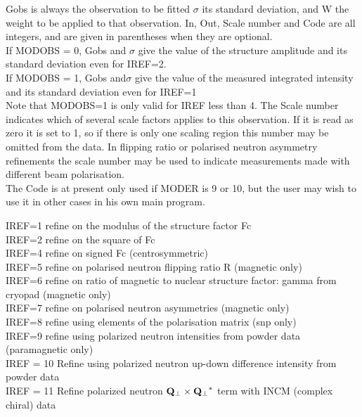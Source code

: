 \begin{varindent}{15mm}Gobs is always the observation to be fitted $\sigma$ its standard deviation,
          and W the weight to be applied to that observation. In, Out,  Scale
          number and Code are all integers, and are given in parentheses when they are optional. \\
If MODOBS = 0, Gobs and $\sigma$  give the value of the structure amplitude and
            its standard deviation even for IREF=2.\\
If MODOBS = 1, Gobs and$\sigma$  give the value of the measured integrated intensity
            and its standard deviation even for IREF=1\\
         Note that MODOBS=1 is only valid for IREF less than 4.
\p 
          The Scale number indicates which of several scale factors applies to
          this observation.  If it is read as zero it is set to 1, so if there
          is only one scaling region this number may be  omitted from the
          data.  In flipping ratio or polarised neutron asymmetry refinements 
          the scale number may be used to indicate measurements made with different 
          beam polarisation.\\
           The Code is at present only used if MODER is 9 or 10, but the user may wish
          to use it in other cases in his own main program.
          \end{varindent}
\p          
{}
\ssk
\begin{varindent}{2 cm}
IREF=1 refine on the modulus of the structure factor Fc\\
IREF=2 refine on the square of Fc\\
IREF=4 refine on signed Fc (centrosymmetric)\\
IREF=5 refine on polarised neutron flipping ratio R (magnetic only)\\
IREF=6 refine on ratio of magnetic to nuclear structure factor: gamma
       from cryopad (magnetic only)\\
IREF=7 refine on polarised neutron asymmetries (magnetic only)\\
IREF=8 refine using elements of the polarisation matrix (snp only)\\
IREF=9 refine using polarized neutron intensities from powder data (paramagnetic only)\\
IREF = 10 Refine using polarized neutron up-down difference intensity from powder data\\
IREF = 11 Refine  polarized neutron $\mbox{$\mathbf{Q_{\perp}}$} \times \mbox{$\mathbf{Q_{\perp}}$}^*$ term with INCM (complex chiral) data\\

\end{varindent}
